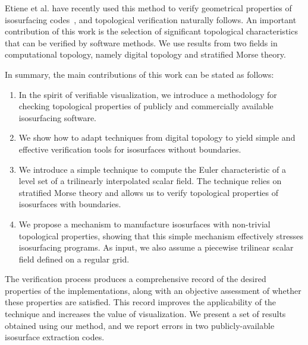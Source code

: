 Etiene et al. have recently used this method to verify geometrical properties of
isosurfacing codes~\cite{etiene:tvcg:2009}, and topological
verification naturally follows.
%
An important contribution of this work is the selection of
significant topological characteristics that can be verified by
software methods.
%
We use results from two fields in computational topology, namely
digital topology and stratified Morse theory.
%

In summary, the main contributions of this work can be stated as
follows:
\begin{enumerate}
\item In the spirit of verifiable visualization, we introduce a
  methodology for checking topological properties of publicly and
  commercially available isosurfacing software.
\item We show how to adapt techniques from digital topology to yield simple
  and effective verification tools for isosurfaces without
  boundaries.
\item We introduce a simple technique to compute the Euler
  characteristic of a level set of a trilinearly interpolated scalar
  field. The technique relies on stratified Morse theory and allows
  us to verify topological properties of isosurfaces with boundaries.
\item We propose a mechanism to manufacture isosurfaces with
  non-trivial topological properties, showing that this simple
  mechanism effectively stresses isosurfacing programs. As input, we
  also assume a piecewise trilinear scalar field defined on a regular
  grid.
%
%
\end{enumerate}
The verification process produces a comprehensive record of the desired properties
of the implementations, along with an objective assessment of whether these
properties are satisfied. This record improves the
applicability of the technique and increases the value of
visualization.
%
%
%
We present a set of results obtained using our method, and we report
errors in two publicly-available isosurface extraction codes.

